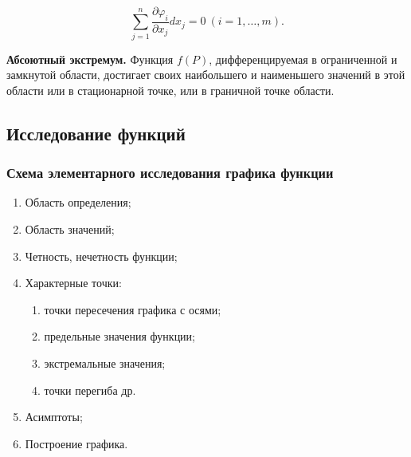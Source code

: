         \[
            \sum^{n}_{j = 1} \frac{\partial \varphi_{i}}{\partial x_{j}} d x_{j} = 0 \: \left( i = 1, \ldots, m \right).
        \]

    \textbf{Абсоютный экстремум.} Функция $f \left( P \right)$, дифференцируемая в ограниченной и замкнутой области, достигает своих наибольшего и наименьшего значений в этой области или в стационарной точке, или в граничной точке области.


    \subsection{Исследование функций}

        \subsubsection{Схема элементарного исследования графика функции}

            \begin{enumerate}
                \item Область определения;

                \item Область значений;

                \item Четность, нечетность функции;

                \item Характерные точки:

                    \begin{enumerate}
                        \item точки пересечения графика с осями;

                        \item предельные значения функции;

                        \item экстремальные значения;

                        \item точки перегиба др.
                    \end{enumerate}

                \item Асимптоты;

                \item Построение графика.
            \end{enumerate}

